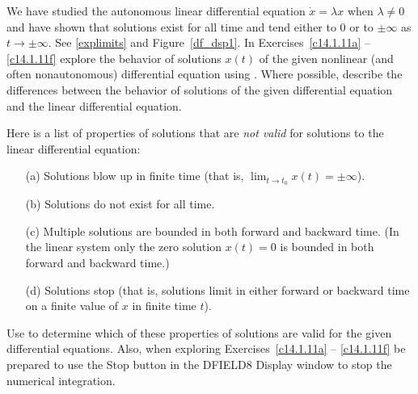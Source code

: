 \documentclass{ximera}
\begin{document}
\noindent We have studied the autonomous linear differential equation 
$\dot{x}=\lambda x$ when $\lambda\neq 0$ and have shown that solutions 
exist for all time and tend either to $0$ or to $\pm\infty$ as $t\to\pm\infty$.
See \eqref{explimits} and Figure~\ref{df_dsp1}.  In Exercises~\ref{c14.1.11a} -- 
\ref{c14.1.11f} explore the behavior of solutions $x(t)$ of the given 
nonlinear (and often nonautonomous) differential equation using {\dfield}.  
Where possible, describe the differences between the behavior of solutions of 
the given differential equation and the linear differential equation.  

  Here is a list of properties of solutions that are 
{\em not valid\/} for solutions to the linear differential equation:
\begin{itemize}
\item[(a)]  Solutions blow up in finite time (that is, 
$\lim_{t\to t_0}x(t)=\pm\infty$).
\item[(b)]  Solutions do not exist for all time.
\item[(c)]  Multiple solutions are bounded in both forward and backward time.
(In the linear system only the zero solution $x(t)=0$ is bounded in both 
forward and backward time.)
\item[(d)]  Solutions stop (that is, solutions limit in either forward or 
backward time on a finite value of $x$ in finite time $t$).
\end{itemize}
Use {\dfield} to determine which of these properties of solutions are 
valid for the given differential equations.  Also, when exploring 
Exercises~\ref{c14.1.11a} -- \ref{c14.1.11f} be prepared to use the {\sf Stop}
button in the {\sf DFIELD8 Display} window to stop the numerical integration. 
\end{document}
